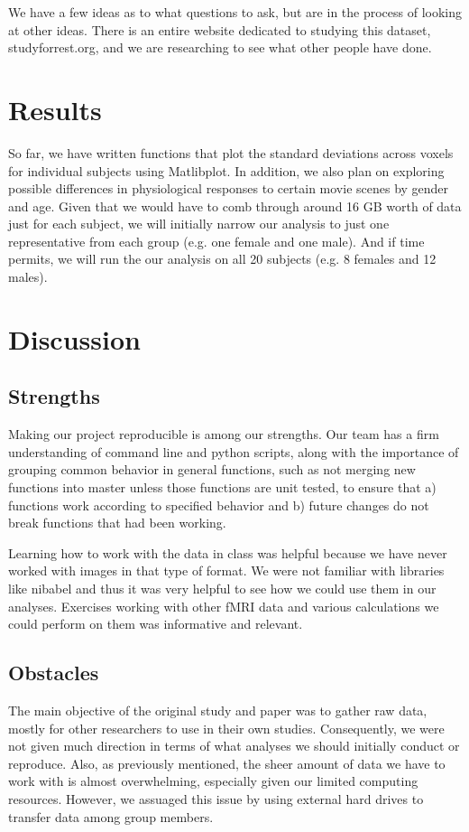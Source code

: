 \documentclass[11pt]{article}
\begin{document}
We have a few ideas as to what questions to ask, but are in the process of
looking at other ideas. There is an entire website dedicated to studying this
dataset, studyforrest.org, and we are researching to see what other people
have done.


\section{Results}

So far, we have written functions that plot the standard
deviations across voxels for individual subjects using Matlibplot. In
addition, we also plan on exploring possible differences in physiological
responses to certain movie scenes by gender and age. Given that we would have
to comb through around 16 GB worth of data just for each subject, we will
initially narrow our analysis to just one representative from each group (e.g.
one female and one male). And if time permits, we will run the our analysis on
all 20 subjects (e.g. 8 females and 12 males).


\section{Discussion}
\subsection{Strengths}

Making our project reproducible is among our strengths. Our team has a firm
understanding of command line and python scripts, along with the importance of
grouping common behavior in general functions, such as not merging new
functions into master unless those functions are unit tested, to ensure that
a) functions work according to specified behavior and b) future changes do not
break functions that had been working.

Learning how to work with the data in class was helpful because we have never
worked with images in that type of format. We were not familiar with libraries
like nibabel and thus it was very helpful to see how we could use them in our
analyses. Exercises working with other fMRI data and various calculations we
could perform on them was informative and relevant.


\subsection{Obstacles}

The main objective of the original study and paper was to gather raw data,
mostly for other researchers to use in their own studies. Consequently, we
were not given much direction in terms of what analyses we should initially
conduct or reproduce. Also, as previously mentioned, the sheer amount of data
we have to work with is almost overwhelming, especially given our limited
computing resources. However, we assuaged this issue by using external hard
drives to transfer data among group members.
\end{document}
